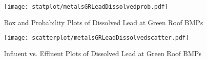         \begin{figure}[hb]   %
            \centering
            \texttt{[image: statplot/metalsGRLeadDissolvedprob.pdf]}
            \caption{Box and Probability Plots of Dissolved Lead at Green Roof BMPs}
        \end{figure}         %
        
        
        \begin{figure}[hb]   %
            \centering
            \texttt{[image: scatterplot/metalsGRLeadDissolvedscatter.pdf]}
            \caption{Influent vs. Effluent Plots of Dissolved Lead at Green Roof BMPs}
        \end{figure}         %
        \clearpage
        